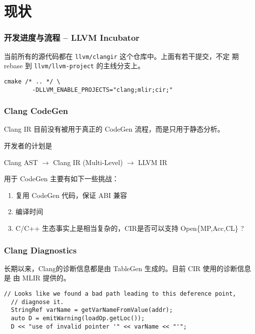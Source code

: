 \section{现状}

\begin{frame}[fragile]
    \frametitle{开发进度与流程 -- LLVM Incubator}

    当前所有的源代码都在 \texttt{llvm/clangir} 这个仓库中。上面有若干提交，不定
    期 rebase 到 \texttt{llvm/llvm-project} 的主线分支上。

    \vspace{2em}
    \begin{lstlisting}[caption=启用ClangIR目前需要的编译指令]
        cmake /* .. */ \
        -DLLVM_ENABLE_PROJECTS="clang;mlir;cir;"
    \end{lstlisting}


\end{frame}

\begin{frame}
    \frametitle{Clang CodeGen}

    Clang IR 目前没有被用于真正的 CodeGen 流程，而是只用于静态分析。

    开发者的计划是
    \begin{center}
        Clang AST $\rightarrow$ Clang IR (Multi-Level) $\rightarrow$ LLVM IR
    \end{center}

    用于 CodeGen 主要有如下一些挑战：

    \begin{enumerate}
        \item 复用 CodeGen 代码，保证 ABI 兼容
        \item 编译时间
        \item C/C++ 生态事实上是相当复杂的，CIR是否可以支持 Open\{MP,Acc,CL\} ?
    \end{enumerate}
\end{frame}

\begin{frame}[fragile]
    \frametitle{Clang Diagnostics}

    长期以来，Clang的诊断信息都是由 TableGen 生成的。目前 CIR 使用的诊断信息是
    由 MLIR 提供的。

    \vspace{1em}

    \begin{lstlisting}[caption=LifetimeCheckPass 中输出诊断信息相关的代码]
  // Looks like we found a bad path leading to this deference point,
  // diagnose it.
  StringRef varName = getVarNameFromValue(addr);
  auto D = emitWarning(loadOp.getLoc());
  D << "use of invalid pointer '" << varName << "'";
    \end{lstlisting}

\end{frame}
